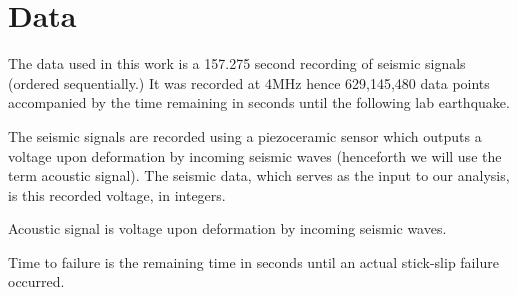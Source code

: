\documentclass[]{llncs} %
\begin{document}
\section{Data} 
The data used in this work is a 157.275 second recording of seismic signals (ordered sequentially.) It was recorded at 4MHz hence 629,145,480 data points accompanied by the time remaining in seconds until the following lab earthquake. \par
The seismic signals are recorded using a piezoceramic sensor which outputs a voltage upon deformation by incoming seismic waves (henceforth we will use the term acoustic signal). The seismic data, which serves as the input to our analysis, is this recorded voltage, in integers. \par
Acoustic signal is voltage upon deformation by incoming seismic waves. \par
Time to failure is the remaining time in seconds until an actual stick-slip failure occurred. \par
\end{document}
